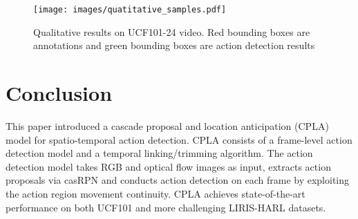 \documentclass{bmvc2k}
\begin{document}
\begin{figure}[!htbp]
\centering
\texttt{[image: images/quatitative\_samples.pdf]}
\caption{Qualitative results on UCF101-24 video. Red bounding boxes are annotations and green bounding boxes are action detection results}
\label{fig:qualitative_results}
\end{figure}

\section{Conclusion}

This paper introduced a cascade proposal and location anticipation (CPLA) model for spatio-temporal action detection. CPLA consists of a frame-level action detection model and a temporal linking/trimming algorithm. The action detection model takes RGB and optical flow images as input, extracts action proposals via casRPN and conducts action detection on each frame by exploiting the action region movement continuity. CPLA achieves state-of-the-art performance on both UCF101 and more challenging LIRIS-HARL datasets.


\end{document}
